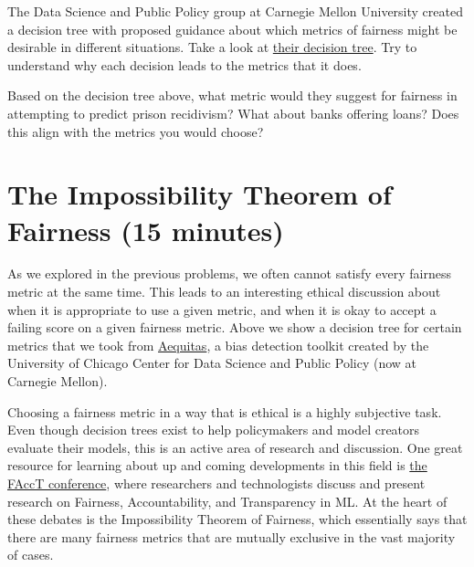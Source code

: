 \documentclass[assignment03_Solutions]{subfiles}
\begin{document}
\begin{exercise}[(40 Minutes)]
\item The Data Science and Public Policy group at Carnegie Mellon University created a decision tree with proposed guidance about which metrics of fairness might be desirable in different situations. Take a look at  \href{http://www.datasciencepublicpolicy.org/wp-content/uploads/2018/05/metrictree-1024x640.png}{their decision tree}. Try to understand why each decision leads to the metrics that it does. 

\item Based on the decision tree above, what metric would they suggest for fairness in attempting to predict prison recidivism? What about banks offering loans? Does this align with the metrics you would choose?




\ees
\end{exercise}



\section*{The Impossibility Theorem of Fairness (15 minutes)}
As we explored in the previous problems, we often cannot satisfy every fairness metric at the same time. This leads to an interesting ethical discussion about when it is appropriate to use a given metric, and when it is okay to accept a failing score on a given fairness metric. Above we show a decision tree for certain metrics that we took from \href{http://www.datasciencepublicpolicy.org/our-work/tools-guides/aequitas/}{Aequitas}, a bias detection toolkit created by the University of Chicago Center for Data Science and Public Policy (now at Carnegie Mellon). 
 
Choosing a fairness metric in a way that is ethical is a highly subjective task. Even though decision trees exist to help policymakers and model creators evaluate their models, this is an active area of research and discussion. One great resource for learning about up and coming developments in this field is \href{https://facctconference.org/}{the FAccT conference}, where researchers and technologists discuss and present research on Fairness, Accountability, and Transparency in ML. At the heart of these debates is the Impossibility Theorem of Fairness, which essentially says that there are many fairness metrics that are mutually exclusive in the vast majority of cases. 
\end{document}
